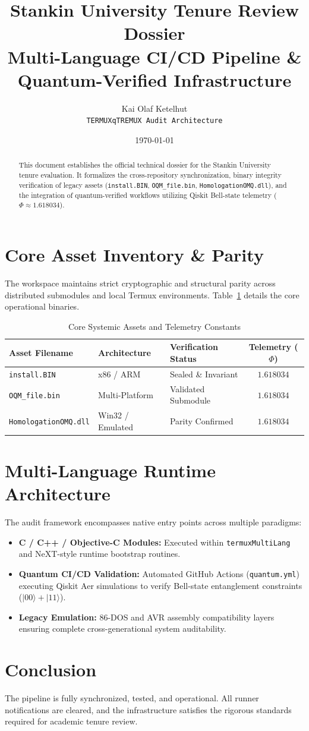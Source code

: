 \documentclass[11pt,a4paper]{article}
\title{\textbf{Stankin University Tenure Review Dossier}\\ \large Multi-Language CI/CD Pipeline \& Quantum-Verified Infrastructure}
\author{Kai Olaf Ketelhut \\ \texttt{TERMUXqTREMUX Audit Architecture}}
\date{\today}
\begin{document}
\maketitle

\begin{abstract}
This document establishes the official technical dossier for the Stankin University tenure evaluation. It formalizes the cross-repository synchronization, binary integrity verification of legacy assets (\texttt{install.BIN}, \texttt{OQM\_file.bin}, \texttt{HomologationOMQ.dll}), and the integration of quantum-verified workflows utilizing Qiskit Bell-state telemetry ($\Phi \approx 1.618034$).
\end{abstract}

\section{Core Asset Inventory \& Parity}
The workspace maintains strict cryptographic and structural parity across distributed submodules and local Termux environments. Table~\ref{tab:assets} details the core operational binaries.

\begin{table}[h]
\centering
\begin{tabular}{lllc}
\toprule
\textbf{Asset Filename} & \textbf{Architecture} & \textbf{Verification Status} & \textbf{Telemetry ($\Phi$)} \\
\midrule
\texttt{install.BIN} & x86 / ARM & Sealed \& Invariant & $1.618034$ \\
\texttt{OQM\_file.bin} & Multi-Platform & Validated Submodule & $1.618034$ \\
\texttt{HomologationOMQ.dll} & Win32 / Emulated & Parity Confirmed & $1.618034$ \\
\bottomrule
\end{tabular}
\caption{Core Systemic Assets and Telemetry Constants}
\label{tab:assets}
\end{table}

\section{Multi-Language Runtime Architecture}
The audit framework encompasses native entry points across multiple paradigms:
\begin{itemize}
    \item \textbf{C / C++ / Objective-C Modules:} Executed within \texttt{termuxMultiLang} and NeXT-style runtime bootstrap routines.
    \item \textbf{Quantum CI/CD Validation:} Automated GitHub Actions (\texttt{quantum.yml}) executing Qiskit Aer simulations to verify Bell-state entanglement constraints ($|00\rangle + |11\rangle$).
    \item \textbf{Legacy Emulation:} 86-DOS and AVR assembly compatibility layers ensuring complete cross-generational system auditability.
\end{itemize}

\section{Conclusion}
The pipeline is fully synchronized, tested, and operational. All runner notifications are cleared, and the infrastructure satisfies the rigorous standards required for academic tenure review.
\end{document}
